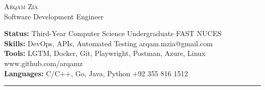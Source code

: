 \documentclass[10pt,A4]{article}
\newcommand{\cvsection}[1]
{
	\begin{center}
		\large\textcolor{sectcol}{\textbf{#1}}
	\end{center}
}
\newcommand{\metasection}[2]
{
\footnotesize{#2} \hspace*{\fill} \footnotesize{#1}\\[1pt]
}
\begin{document}
\pagestyle{fancy}	



\vspace{-8pt}
\begin{center}
	\HUGE \textsc{Arqam Zia} %
        \\[2pt]
	\small Software Development Engineer
\end{center}

\vspace{6pt}

\metasection{FAST NUCES}{\textbf{Status:} Third-Year Computer Science Undergraduate}
\metasection{arqam.mzia@gmail.com}{\textbf{Skills:} DevOps, APIs, Automated Testing} 
\metasection{www.github.com/arqamz}{\textbf{Tools:} LGTM, Docker, Git, Playwright, Postman, Azure, Linux}
\metasection{+92 355 816 1512}{\textbf{Languages:} C/C++, Go, Java, Python}
\vspace{-2pt}
\textcolor{softcol}{\hrule}
\vspace{6pt}

\normalsize

\end{document}
